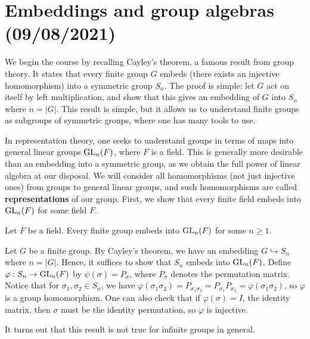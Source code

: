 \section{Embeddings and group algebras (09/08/2021)}

We begin the course by recalling Cayley's theorem, a famous result from group theory. It states that 
every finite group $G$ embeds (there exists an injective homomorphism) into a symmetric group $S_n$. 
The proof is simple: let $G$ act on itself by left multiplication, and show that this gives an 
embedding of $G$ into $S_n$ where $n = |G|$. This result is simple, but it allows us to understand 
finite groups as subgroups of symmetric groups, where one has many tools to use. 

In representation theory, one seeks to understand groups in terms of maps into general linear groups 
$\operatorname{GL}_n(F)$, where $F$ is a field. This is generally more desirable than an embedding into 
a symmetric group, as we obtain the full power of linear algebra at our disposal. We will consider 
all homomorphisms (not just injective ones) from groups to general linear groups, and such 
homomorphisms are called {\bf representations} of our group. First, we show that 
every finite field embeds into $\operatorname{GL}_n(F)$ for some field $F$.

\begin{prop}{}
Let $F$ be a field. Every finite group embeds into $\operatorname{GL}_n(F)$ for some $n \geq 1$. 
\end{prop}
\begin{pf}
Let $G$ be a finite group. By Cayley's theorem, we have an embedding $G \hookrightarrow S_n$ 
where $n = |G|$. Hence, it suffices to show that $S_n$ embeds into $\operatorname{GL}_n(F)$. Define 
$\varphi : S_n \to \operatorname{GL}_n(F)$ by $\psi(\sigma) = P_\sigma$, where $P_\sigma$ denotes the permutation matrix. Notice that for $\sigma_1, \sigma_2 \in S_n$, we have $\varphi(\sigma_1\sigma_2) 
= P_{\sigma_1\sigma_2} = P_{\sigma_1}P_{\sigma_2} = \varphi(\sigma_1\sigma_2)$, so $\varphi$ is a 
group homomorphism. One can also check that if $\varphi(\sigma) = I$, the identity matrix, then 
$\sigma$ must be the identity permutation, so $\varphi$ is injective.
\end{pf}

It turns out that this result is not true for infinite groups in general. 

